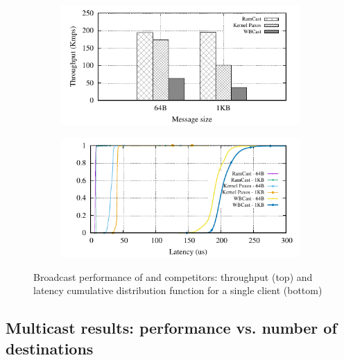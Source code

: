 \begin{figure}[htp!]
  \begin{subfigure}{\columnwidth}
    \advance\leftskip-0.1cm
    \includegraphics[width=0.99\columnwidth]{figures/benchmark/graphs/figure-compare-single-group-throughput}
  \end{subfigure}
  \begin{subfigure}{\columnwidth}
    \centering
    \includegraphics[width=0.95\columnwidth]{figures/benchmark/graphs/figure-compare-single-group-latency-cdf}
  \end{subfigure}
  \caption{Broadcast performance of \libname and competitors: throughput (top) and latency cumulative distribution function for a single client (bottom)}
  \label{fig:broadcast}
\end{figure}


\subsection{Multicast results: performance vs. number of destinations}
\label{sec:evaluation:multicast}

